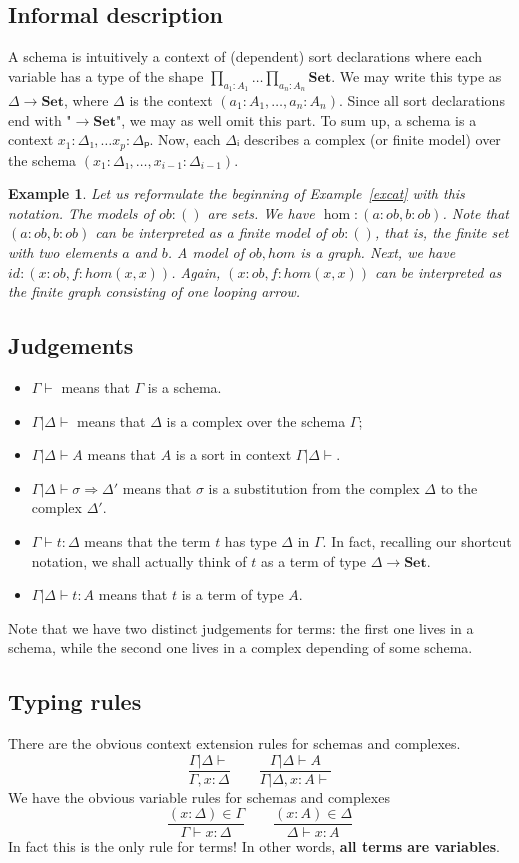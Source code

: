 \documentclass{article}
\newtheorem{example}{Example}
\begin{document}
\subsection{Informal description}
A schema is intuitively a context of (dependent) sort declarations where
each variable has a type of the shape $∏_{a_1:A_1} … ∏_{a_n:A_n} 𝐒𝐞𝐭$.
We may write this type as $Δ → 𝐒𝐞𝐭$, where $Δ$ is the context 
$(a_1 : A_1, …, a_n : A_n)$. Since all sort declarations end with 
"$→ 𝐒𝐞𝐭$", we may as well omit this part. To sum up, a schema is a context 
$x_1 : Δ₁, … x_p : Δₚ$. Now, each $Δᵢ$ describes a complex (or finite model) over the schema
$(x_1 : Δ₁, …, x_{i-1}:Δ_{i-1})$.
\begin{example}
 Let us reformulate the beginning of Example~\ref{excat} with this notation.
 The models of $ob:()$ are sets.
 We have $\hom : (a:ob, b:ob)$. Note that $(a:ob, b:ob)$ can be interpreted as a finite model 
 of $ob:()$, that is, the finite set with two elements $a$ and $b$. A model of $ob,hom$ is a graph.
 Next, we have $id : (x:ob, f:hom(x,x))$. Again, $(x:ob, f:hom(x,x))$ can be interpreted as the finite graph consisting of one looping arrow.
\end{example}

\subsection{Judgements}
\begin{itemize}
    \item $Γ ⊢$ means that $Γ$ is a schema.
\item $Γ| Δ ⊢$ means that $Δ$ is a complex over the schema $Γ$;
\item $Γ | Δ ⊢ A$ means that $A$ is a sort in context $Γ | Δ ⊢$.
 \item $Γ | Δ ⊢ σ ⇒ Δ'$ means that $σ$ is a substitution from the complex $Δ$ to the complex $Δ'$.
 \item $Γ ⊢ t : Δ$ means that the term $t$ has type $Δ$ in $Γ$. In fact, recalling our shortcut notation, we shall actually think of $t$ as a term of type $Δ → 𝐒𝐞𝐭$.

\item $Γ | Δ ⊢ t : A$ means that $t$ is a term of type $A$.

\end{itemize}
Note that we have two distinct judgements for terms: the first one lives in a schema, while the 
second one lives in a complex depending of some schema.

\subsection{Typing rules}
There are the obvious context extension rules for schemas and complexes.
\[
\dfrac{Γ|Δ⊢}{Γ,x:Δ}
\qquad 
\dfrac{Γ|Δ⊢A}{Γ|Δ,x:A ⊢}
\]
We have the obvious variable rules for schemas and complexes
\[
\dfrac{(x : Δ) ∈ Γ}{Γ⊢x:Δ}
\qquad 
\dfrac{(x:A)∈Δ}{Δ⊢x:A}
\]
In fact this is the only rule for terms! 
In other words, \textbf{all terms are variables}.
\end{document}
